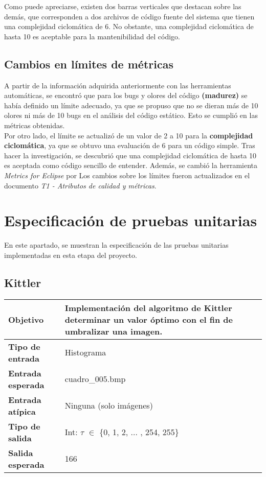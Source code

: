 \documentclass{scrreprt}
\begin{document}
Como puede apreciarse, existen dos barras verticales que destacan sobre las demás, que corresponden a dos archivos de código fuente del sistema que tienen una complejidad ciclomática de 6. No obstante, una complejidad ciclomática de hasta 10 es aceptable para la mantenibilidad del código.

\section{Cambios en límites de métricas}

A partir de la información adquirida anteriormente con las herramientas automáticas, se encontró que para los bugs y olores del código \textbf{(madurez)} se había definido un límite adecuado, ya que se propuso que no se dieran más de 10 olores ni más de 10 bugs en el análisis del código estático. Esto se cumplió en las métricas obtenidas.\\

Por otro lado, el límite se actualizó de un valor de 2 a 10 para la \textbf{complejidad ciclomática}, ya que se obtuvo una evaluación de 6 para un código simple. Tras hacer la investigación, se descubrió que una complejidad ciclomática de hasta 10 es aceptada como código sencillo de entender. Además, se cambió la herramienta \textit{Metrics for Eclipse} por  Los cambios sobre los límites fueron actualizados en el documento \textit{T1 - Atributos de calidad y métricas}.\\



\chapter{Especificación de pruebas unitarias}

En este apartado, se muestran la especificación de las pruebas unitarias implementadas en esta etapa del proyecto.

\section{Kittler}

\vspace{0.3cm}
\begin{center}
    \begin{tabular}{|p{4.0cm}|p{9.0cm}|}
        \hline
	    \textbf{Objetivo} & Implementación del algoritmo de Kittler determinar un valor óptimo con el fin de umbralizar una imagen. \\
        \hline
	    \textbf{Tipo de entrada} & Histograma \\
        \hline
	    \textbf{Entrada esperada} & cuadro_005.bmp \\
        \hline
	    \textbf{Entrada atípica} & Ninguna (solo imágenes) \\
        \hline
	    \textbf{Tipo de salida} & Int: \(\tau\) \(\in\) \{0, 1, 2, ... , 254, 255\} \\
        \hline
	    \textbf{Salida esperada} & 166 \\
        \hline        
    \end{tabular}
\end{center}
\end{document}
